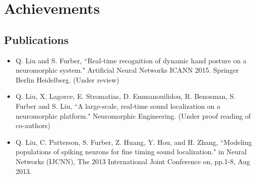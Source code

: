 
\section{Achievements }
\subsection{Publications}
\begin{itemize}

	\item Q. Liu and S. Furber, ``Real-time recognition of dynamic hand posture on a neuromorphic system." Artificial Neural Networks ICANN 2015. Springer Berlin Heidelberg. (Under review)


	\item Q. Liu, X. Lagorce, E. Stromatias, D. Emmanouilidou, R. Benosman, S. Furber and S. Liu, ``A large-scale, real-time sound localization on a neuromorphic platform." Neuromorphic Engineering. (Under proof reading of co-authors)

	\item Q. Liu, C. Patterson, S. Furber, Z. Huang, Y. Hou, and H. Zhang, ``Modeling populations of spiking neurons for fine timing sound localization." in Neural Networks (IJCNN), The 2013 International Joint Conference on, pp.1-8, Aug 2013.
\end{itemize}
